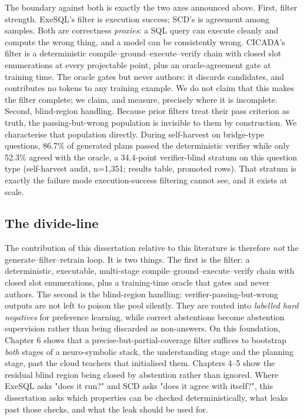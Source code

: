 The boundary against both is exactly the two axes announced above. First, filter strength. ExeSQL's filter is execution success; SCD's is agreement among samples. Both are correctness \emph{proxies}: a SQL query can execute cleanly and compute the wrong thing, and a model can be consistently wrong. CICADA's filter is a deterministic compile--ground--execute--verify chain with closed slot enumerations at every projectable point, plus an oracle-agreement gate at training time. The oracle gates but never authors: it discards candidates, and contributes no tokens to any training example. We do not claim that this makes the filter complete; we claim, and measure, precisely where it is incomplete. Second, blind-region handling. Because prior filters treat their pass criterion as truth, the passing-but-wrong population is invisible to them by construction. We characterise that population directly. During self-harvest on bridge-type questions, 86.7\% of generated plans passed the deterministic verifier while only 52.3\% agreed with the oracle, a 34.4-point verifier-blind stratum on this question type (self-harvest audit, n=1,351; results table, promoted rows). That stratum is exactly the failure mode execution-success filtering cannot see, and it exists at scale.

\subsection{The divide-line}\label{sec:the-divide-line}

The contribution of this dissertation relative to this literature is therefore \emph{not} the generate--filter--retrain loop. It is two things. The first is the filter: a deterministic, executable, multi-stage compile--ground--execute--verify chain with closed slot enumerations, plus a training-time oracle that gates and never authors. The second is the blind-region handling: verifier-passing-but-wrong outputs are not left to poison the pool silently. They are routed into \emph{labelled hard negatives} for preference learning, while correct abstentions become abstention supervision rather than being discarded as non-answers. On this foundation, Chapter 6 shows that a precise-but-partial-coverage filter suffices to bootstrap \emph{both} stages of a neuro-symbolic stack, the understanding stage and the planning stage, past the cloud teachers that initialised them. Chapters 4--5 show the residual blind region being closed by abstention rather than ignored. Where ExeSQL asks "does it run?" and SCD asks "does it agree with itself?", this dissertation asks which properties can be checked deterministically, what leaks past those checks, and what the leak should be used for.

